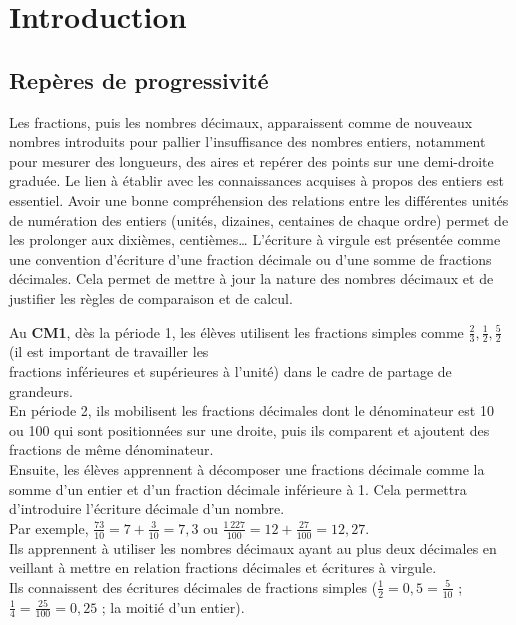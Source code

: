 \reperes 

\section{Introduction}


\subsection{Repères de progressivité}

Les fractions, puis les nombres décimaux, apparaissent comme de nouveaux nombres introduits pour pallier l’insuffisance des nombres entiers, notamment pour mesurer des longueurs, des aires et repérer des points sur une demi-droite graduée. Le lien à établir avec les connaissances acquises à propos des entiers est essentiel. Avoir une bonne compréhension des relations entre les différentes unités de numération des entiers (unités, dizaines, centaines de chaque ordre) permet de les prolonger aux dixièmes, centièmes\dots{} L’écriture à virgule est présentée comme une convention d’écriture d’une fraction décimale ou d’une somme de fractions décimales. Cela permet de mettre à jour la nature des nombres décimaux et de justifier les règles de comparaison et de calcul. 

Au {\bf CM1}, dès la période 1, les élèves utilisent les fractions simples comme $\frac23, \frac12, \frac52$ (il est important de travailler les\\[1mm]fractions inférieures et supérieures à l'unité) dans le cadre de partage de grandeurs. \\
En période 2, ils mobilisent les fractions décimales dont le dénominateur est 10 ou 100 qui sont positionnées sur une droite, puis ils comparent et ajoutent des fractions de même dénominateur. \\
Ensuite, les élèves apprennent à décomposer une fractions décimale comme la somme d'un entier et d'un fraction décimale inférieure à 1. Cela permettra d'introduire l'écriture décimale d'un nombre. \\ [1mm]
Par exemple, $\frac{73}{10} =7+\frac{3}{10} = 7,3$ ou $\frac{1\,227}{100} =12+\frac{27}{100} =12,27$. \\
Ils apprennent à utiliser les nombres décimaux ayant au plus deux décimales en veillant à mettre en relation fractions décimales et écritures à virgule. \\
Ils connaissent des écritures décimales de fractions simples ($\frac12 =0,5 =\frac{5}{10}$ ; $\frac14 =\frac{25}{100} =0,25$ ; la moitié d'un entier).


